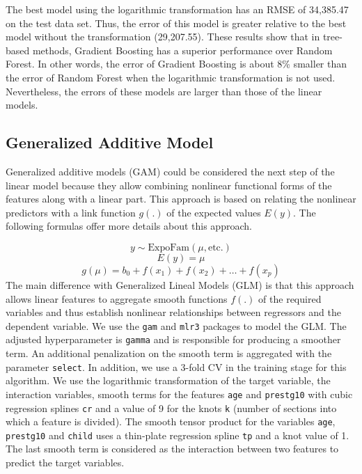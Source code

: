 \documentclass[11pt,a4paper]{article}
\begin{document}
The best model using the logarithmic transformation has an RMSE of
34,385.47 on the test data set. Thus, the error of this model is greater
relative to the best model without the transformation (29,207.55). These
results show that in tree-based methods, Gradient Boosting has a
superior performance over Random Forest. In other words, the error of
Gradient Boosting is about 8\% smaller than the error of Random Forest
when the logarithmic transformation is not used. Nevertheless, the
errors of these models are larger than those of the linear models.

\hypertarget{generalized-additive-model}{%
\subsection{Generalized Additive
Model}\label{generalized-additive-model}}

Generalized additive models (GAM) could be considered the next step of
the linear model because they allow combining nonlinear functional forms
of the features along with a linear part. This approach is based on
relating the nonlinear predictors with a link function \(g(.)\) of the
expected values \(E(y)\). The following formulas offer more details
about this approach.

\[
y \sim \text{ExpoFam}(\mu, \text{etc.})
\] \[
E(y) = \mu
\] \[
g(\mu) = b_0 + f(x_1) + f(x_2) + \dots + f(x_p)
\] The main difference with Generalized Lineal Models (GLM) is that this
approach allows linear features to aggregate smooth functions \(f(.)\)
of the required variables and thus establish nonlinear relationships
between regressors and the dependent variable. We use the \texttt{gam}
and \texttt{mlr3} packages to model the GLM. The adjusted hyperparameter
is \texttt{gamma} and is responsible for producing a smoother term. An
additional penalization on the smooth term is aggregated with the
parameter \texttt{select}. In addition, we use a 3-fold CV in the
training stage for this algorithm. We use the logarithmic transformation
of the target variable, the interaction variables, smooth terms for the
features \texttt{age} and \texttt{prestg10} with cubic regression
splines \texttt{cr} and a value of 9 for the knots \texttt{k} (number of
sections into which a feature is divided). The smooth tensor product for
the variables \texttt{age}, \texttt{prestg10} and \texttt{child} uses a
thin-plate regression spline \texttt{tp} and a knot value of 1. The last
smooth term is considered as the interaction between two features to
predict the target variables.
\end{document}
